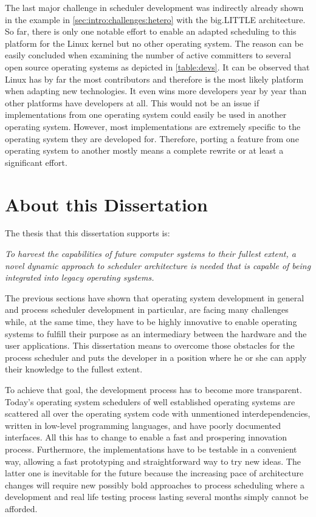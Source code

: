 The last major challenge in scheduler development was indirectly already shown in the example in \cref{sec:intro:challenges:hetero} with the big.LITTLE architecture. So far, there is only one notable effort to enable an adapted scheduling to this platform for the Linux kernel but no other operating system. The reason can be easily concluded when examining the number of active committers to several open source operating systems as depicted in \cref{table:devs}. It can be observed that Linux has by far the most contributors and therefore is the most likely platform when adapting new technologies. It even wins more developers year by year than other platforms have developers at all. This would not be an issue if implementations from one operating system could easily be used in another operating system. However, most implementations are extremely specific to the operating system they are developed for. Therefore, porting a feature from one operating system to another mostly means a complete rewrite or at least a significant effort.

\section{About this Dissertation}

The thesis that this dissertation supports is:\vspace{3mm}
\begin{center}
	\begin{minipage}{.85\textwidth}\itshape{}
		To harvest the capabilities of future computer systems to their fullest extent, a novel dynamic approach to scheduler architecture is needed that is capable of being integrated into legacy operating systems.
	\end{minipage}
\end{center}\vspace{3mm}
The previous sections have shown that operating system development in general and process scheduler development in particular, are facing many challenges while, at the same time, they have to be highly innovative to enable operating systems to fulfill their purpose as an intermediary between the hardware and the user applications. This dissertation means to overcome those obstacles for the process scheduler and puts the developer in a position where he or she can apply their knowledge to the fullest extent.

To achieve that goal, the development process has to become more transparent. Today's operating system schedulers of well established operating systems are scattered all over the operating system code with unmentioned interdependencies, written in low-level programming languages, and have poorly documented interfaces. All this has to change to enable a fast and prospering innovation process. Furthermore, the implementations have to be testable in a convenient way, allowing a fast prototyping and straightforward way to try new ideas. The latter one is inevitable for the future because the increasing pace of architecture changes will require new possibly bold approaches to process scheduling where a development and real life testing process lasting several months simply cannot be afforded.

